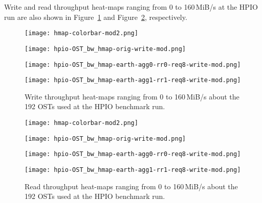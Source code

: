 \documentclass{jhps}
\begin{document}
Write and read throughput heat-maps ranging from 0 to 160\,MiB/s
at the HPIO run are also shown in
Figure~\ref{fig:HPIO_OST_BW_HMAP_WR} and Figure~\ref{fig:HPIO_OST_BW_HMAP_RD}, respectively.
%
\begin{figure}[tb]
\begin{minipage}[t]{0.06\textwidth}
 \texttt{[image: hmap-colorbar-mod2.png]}
\end{minipage}
%
\noindent
\begin{minipage}[t]{0.29\textwidth}
 \centering
 \texttt{[image: hpio-OST\_bw\_hmap-orig-write-mod.png]}
\end{minipage}
%
\noindent
\begin{minipage}[t]{0.29\textwidth}
 \centering
 \texttt{[image: hpio-OST\_bw\_hmap-earth-agg0-rr0-req8-write-mod.png]}
\end{minipage}
%
\noindent
\begin{minipage}[t]{0.31\textwidth}
 \centering
 \texttt{[image: hpio-OST\_bw\_hmap-earth-agg1-rr1-req8-write-mod.png]}
\end{minipage}
%
\caption{Write throughput heat-maps ranging from 0 to 160\,MiB/s about
the 192 OSTs used at the HPIO benchmark run.}
\label{fig:HPIO_OST_BW_HMAP_WR}
\end{figure}
%
\begin{figure}[tb]
\begin{minipage}[t]{0.06\textwidth}
 \texttt{[image: hmap-colorbar-mod2.png]}
\end{minipage}
%
\noindent
\begin{minipage}[t]{0.29\textwidth}
 \centering
 \texttt{[image: hpio-OST\_bw\_hmap-orig-write-mod.png]}
\end{minipage}
%
\noindent
\begin{minipage}[t]{0.29\textwidth}
 \centering
 \texttt{[image: hpio-OST\_bw\_hmap-earth-agg0-rr0-req8-write-mod.png]}
\end{minipage}
%
\noindent
\begin{minipage}[t]{0.31\textwidth}
 \centering
 \texttt{[image: hpio-OST\_bw\_hmap-earth-agg1-rr1-req8-write-mod.png]}
\end{minipage}
%
\caption{Read throughput heat-maps ranging from 0 to 160\,MiB/s about
the 192 OSTs used at the HPIO benchmark run.}
\label{fig:HPIO_OST_BW_HMAP_RD}
\end{figure}
\end{document}

